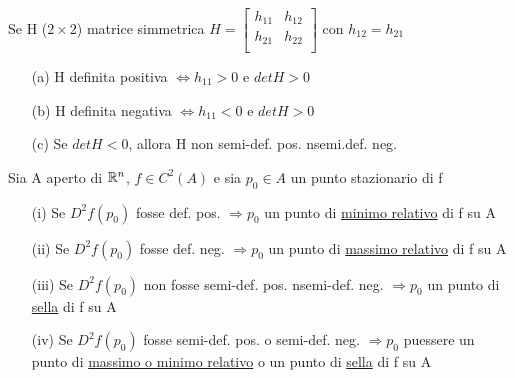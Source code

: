 \begin{corollary}
  Se H ($2\times 2$) matrice simmetrica $H = \begin{bmatrix}
    h_{11} & h_{12} \\
    h_{21} & h_{22} \\
  \end{bmatrix}$ con $h_{12} = h_{21}$
  \begin{enumerate}
    \item[(a)] H \ace definita positiva $\iff h_{11} > 0$ e $detH > 0$
    \item[(b)] H \ace definita negativa $\iff h_{11} < 0$ e $detH > 0$
    \item[(c)] Se $detH < 0$, allora H non \ace semi-def. pos. n\ace semi.def. neg.
  \end{enumerate}
\end{corollary}
\begin{theorem}[BDPG,11.25]
  Sia A aperto di $\mathbb{R}^n$, $f\in C^2(A)$ e sia $p_0\in A$ un punto stazionario di f
  \begin{enumerate}
    \item[(i)] Se $D^2f(p_0)$ fosse def. pos. $\Rightarrow p_0$ \ace un punto di \underline{minimo relativo} di f su A
    \item[(ii)] Se $D^2f(p_0)$ fosse def. neg. $\Rightarrow p_0$ \ace un punto di \underline{massimo relativo} di f su A
    \item[(iii)] Se $D^2f(p_0)$ non fosse semi-def. pos. n\ace semi-def. neg. $\Rightarrow p_0$ \ace un punto di \underline{sella} di f su A
    \item[(iv)] Se $D^2f(p_0)$ fosse semi-def. pos. o semi-def. neg. $\Rightarrow p_0$ pu\aco essere un punto di \underline{massimo o minimo relativo} o 
                un punto di \underline{sella} di f su A
  \end{enumerate}
\end{theorem}
